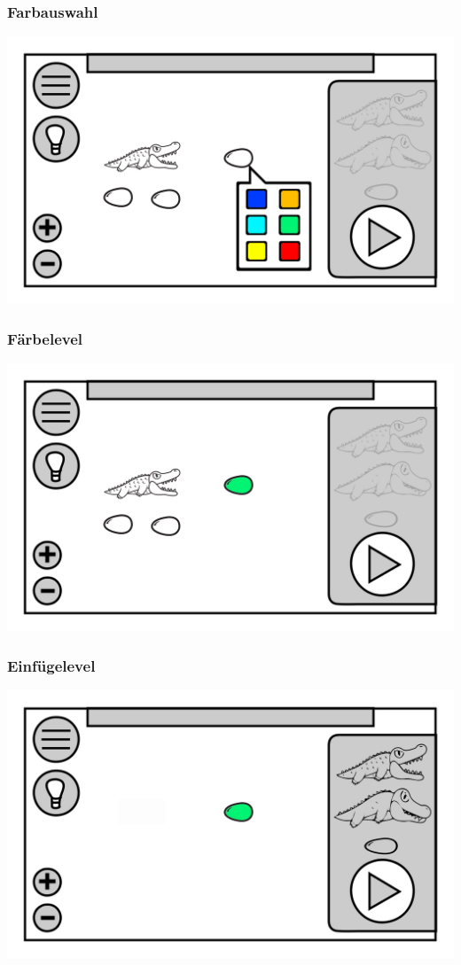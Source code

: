 \documentclass[t]{beamer}
\begin{document}
\begin{frame}
	\frametitle{Farbauswahl}
	\includegraphics[height=\textheight]{level_color.png}
\end{frame}
\begin{frame}
	\frametitle{Färbelevel}
	\includegraphics[height=\textheight]{level_colored_egg.png}
\end{frame}
\begin{frame}
	\frametitle{Einfügelevel}
	\includegraphics[height=\textheight]{level_start.png}
\end{frame}
\end{document}
